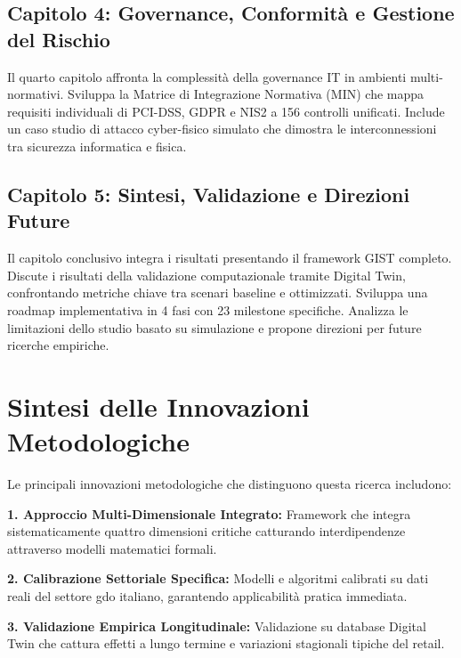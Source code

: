\subsection{\texorpdfstring{Capitolo 4: Governance, Conformità e Gestione del Rischio}{1.6.3 - Capitolo 4: Governance, Conformità e Gestione del Rischio}}
\label{subsec:struttura_cap4}

Il quarto capitolo affronta la complessità della governance IT in ambienti multi-normativi. Sviluppa la Matrice di Integrazione Normativa (MIN) che mappa requisiti individuali di PCI-DSS, GDPR e NIS2 a 156 controlli unificati. Include un caso studio di attacco cyber-fisico simulato che dimostra le interconnessioni tra sicurezza informatica e fisica.

\subsection{\texorpdfstring{Capitolo 5: Sintesi, Validazione e Direzioni Future}{1.6.4 - Capitolo 5: Sintesi, Validazione e Direzioni Future}}
\label{subsec:struttura_cap5}

Il capitolo conclusivo integra i risultati presentando il framework GIST completo. Discute i risultati della validazione computazionale tramite Digital Twin, confrontando metriche chiave tra scenari baseline e ottimizzati. Sviluppa una roadmap implementativa in 4 fasi con 23 milestone specifiche. Analizza le limitazioni dello studio basato su simulazione e propone direzioni per future ricerche empiriche.

\section{\texorpdfstring{Sintesi delle Innovazioni Metodologiche}{1.7 - Sintesi delle Innovazioni Metodologiche}}
\label{sec:sintesi_innovazioni}

Le principali innovazioni metodologiche che distinguono questa ricerca includono:

\textbf{1. Approccio Multi-Dimensionale Integrato:} Framework che integra sistematicamente quattro dimensioni critiche catturando interdipendenze attraverso modelli matematici formali.

\textbf{2. Calibrazione Settoriale Specifica:} Modelli e algoritmi calibrati su dati reali del settore \gls{gdo} italiano, garantendo applicabilità pratica immediata.

\textbf{3. Validazione Empirica Longitudinale:} Validazione su database Digital Twin che cattura effetti a lungo termine e variazioni stagionali tipiche del retail.

